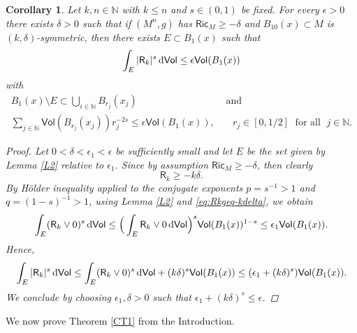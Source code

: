 \documentclass[10pt]{article}
\newtheorem{corollary}[thm]{Corollary}
\theoremstyle{definition}
\newcommand{\bb}[1]{\mathbb{#1}}
\newcommand{\ssf}[1]{\mathsf{#1}}
\newcommand{\Ric}{\mathsf{Ric}}
\newcommand{\R}{\mathsf{R}}
\newcommand{\de}{{\rm d}}
\begin{document}
\begin{corollary} \label{C1}
    Let $k,n \in \bb{N}$ with $k \leq n$ and $s \in (0,1)$ be fixed. 
    For every $\epsilon >0$ there exists $\delta>0$ such that if $(M^n,g)$ has $\Ric_M \geq -\delta$ and $B_{10}(x) \subset M$ is $(k,\delta)$-symmetric, then there exists $E \subset B_1(x)$ such that
        \[
         \int_{E} |\R_k|^s \,\de\ssf{Vol} \leq \epsilon \ssf{Vol}(B_1(x))
         \]
         with
         \[
         \begin{split}
        B_1(x) \setminus E \subset \bigcup_{i \in \bb{N}} B_{r_j}(x_j)& \text{ and } \\ 
        \sum_{j \in \bb{N}} \ssf{Vol}(B_{r_j}(x_j))r_j^{-2s} \leq \epsilon \ssf{Vol}(B_1(x)),& \quad r_j \in [0,1/2]  \;\text{ for all }\; j \in \bb{N}.
        \end{split}
        \]
        \begin{proof}
            Let $0<\delta<\epsilon_1<\epsilon$ be sufficiently small and let $E$ be the set given by Lemma \ref{L2} relative to $\epsilon_1$.
            Since by assumption $\Ric_M \geq -\delta$, then  clearly
            \begin{equation}\label{eq:Rkgeq-kdelta}
                \R_k \geq -k \delta.
            \end{equation}
            By Hölder inequality applied to the conjugate exponents $p=s^{-1}>1$ and  $q=(1-s)^{-1}>1$, using    Lemma \ref{L2} and \eqref{eq:Rkgeq-kdelta}, we obtain
            \[
             \int_{E} (\R_k \vee 0)^s \,\de\ssf{Vol} \leq \Big( \int_E \R_k \vee 0 \,\de\ssf{Vol} \Big)^s \ssf{Vol}(B_1(x))^{1-s}  \leq \epsilon_1 \ssf{Vol}(B_1(x)). 
            \]
            Hence,
            \[
            \int_{E} |\R_k|^s \,\de\ssf{Vol} \leq 
             \int_{E} (\R_k \vee 0)^s \,\de\ssf{Vol}+ (k \delta)^s \ssf{Vol}(B_1(x)) \leq 
            (\epsilon_1+(k \delta)^s) \ssf{Vol}(B_1(x)).
            \]
            We conclude by choosing $\epsilon_1,\delta>0$ such that $\epsilon_1+(k \delta)^s \leq \epsilon$.
        \end{proof}
\end{corollary}

We now prove Theorem \ref{CT1} from the Introduction.
\end{document}
